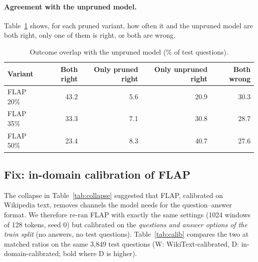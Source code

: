 \paragraph{Agreement with the unpruned model.} Table~\ref{tab:pair} shows, for each pruned variant, how often it and the unpruned model are both right, only one of them is right, or both are wrong.

\begin{table}[!htbp]\centering\small
\begin{tabular}{lrrrr}
\toprule
Variant & Both right & Only pruned right & Only unpruned right & Both wrong \\
\midrule
FLAP 20\% & 43.2 & 5.6 & 20.9 & 30.3 \\
FLAP 35\% & 33.3 & 7.1 & 30.8 & 28.7 \\
FLAP 50\% & 23.4 & 8.3 & 40.7 & 27.6 \\
\bottomrule
\end{tabular}
\caption{Outcome overlap with the unpruned model (\% of test questions).}\label{tab:pair}
\end{table}

\subsection{Fix: in-domain calibration of FLAP}
The collapse in Table~\ref{tab:collapse} suggested that FLAP, calibrated on Wikipedia text, removes channels the model needs for the question--answer format. We therefore re-ran FLAP with exactly the same settings (1024 windows of 128 tokens, seed 0) but calibrated on the \emph{questions and answer options of the train split} (no answers, no test questions). Table~\ref{tab:calib} compares the two at matched ratios on the same 3{,}849 test questions (W: WikiText-calibrated, D: in-domain-calibrated; bold where D is higher).

